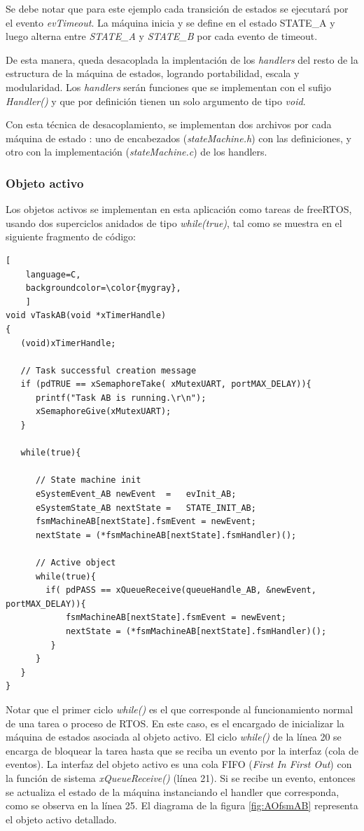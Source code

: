 Se debe notar que para este ejemplo cada transición de estados se ejecutará por el evento \textit{evTimeout}. La máquina inicia y se define en el estado STATE\_A y luego alterna entre \textit{STATE\_A} y \textit{STATE\_B} por cada evento de timeout.

De esta manera, queda desacoplada la implentación de los \textit{handlers} del resto de la estructura de la máquina de estados, logrando portabilidad, escala y modularidad. Los \textit{handlers} serán funciones que se implementan con el sufijo \textit{Handler()} y que por definición tienen un solo argumento de tipo \textit{void}.

Con esta técnica de desacoplamiento, se implementan dos archivos por cada máquina de estado : uno de encabezados (\textit{stateMachine.h}) con las definiciones, y otro con la implementación (\textit{stateMachine.c}) de los handlers.




\subsubsection{Objeto activo}
	
Los objetos activos se implementan en esta aplicación como tareas de freeRTOS, usando dos superciclos anidados de tipo \textit{while(true)}, tal como se muestra en el siguiente fragmento de código: 

\begin{lstlisting}[
	language=C, 
	backgroundcolor=\color{mygray},
	]
void vTaskAB(void *xTimerHandle)
{
   (void)xTimerHandle;

   // Task successful creation message
   if (pdTRUE == xSemaphoreTake( xMutexUART, portMAX_DELAY)){
      printf("Task AB is running.\r\n");
      xSemaphoreGive(xMutexUART);
   }

   while(true){
      
      // State machine init
      eSystemEvent_AB newEvent	=	evInit_AB;
      eSystemState_AB nextState	=	STATE_INIT_AB;
      fsmMachineAB[nextState].fsmEvent = newEvent; 
      nextState = (*fsmMachineAB[nextState].fsmHandler)();

      // Active object
      while(true){
        if( pdPASS == xQueueReceive(queueHandle_AB, &newEvent, portMAX_DELAY)){
            fsmMachineAB[nextState].fsmEvent = newEvent; 
            nextState = (*fsmMachineAB[nextState].fsmHandler)();
         }
      }
   }
}
\end{lstlisting}

Notar que el primer ciclo \textit{while()} es el que corresponde al funcionamiento normal de una tarea o proceso de RTOS. En este caso, es el encargado de inicializar la máquina de estados asociada al objeto activo. El ciclo \textit{while()} de la línea 20 se encarga de bloquear la tarea hasta que se reciba un evento por la interfaz (cola de eventos). La interfaz del objeto activo es una cola FIFO (\textit{First In First Out}) con la función de sistema \textit{xQueueReceive() }(línea 21). Si se recibe un evento, entonces se actualiza el estado de la máquina instanciando el handler que corresponda, como se observa en la línea 25. El diagrama de la figura \ref{fig:AOfsmAB} representa el objeto activo detallado. 

